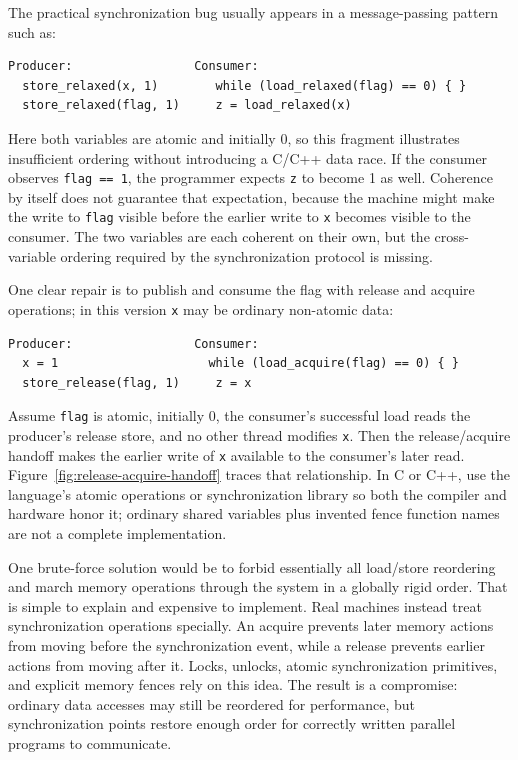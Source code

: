 The practical synchronization bug usually appears in a message-passing pattern such as:
\begin{verbatim}
Producer:                 Consumer:
  store_relaxed(x, 1)        while (load_relaxed(flag) == 0) { }
  store_relaxed(flag, 1)     z = load_relaxed(x)
\end{verbatim}
Here both variables are atomic and initially 0, so this fragment illustrates insufficient ordering without introducing a C/C++ data race.
If the consumer observes \texttt{flag == 1}, the programmer expects \texttt{z} to become 1 as well.
Coherence by itself does not guarantee that expectation, because the machine might make the write to \texttt{flag} visible before the earlier write to \texttt{x} becomes visible to the consumer.
The two variables are each coherent on their own, but the cross-variable ordering required by the synchronization protocol is missing.

One clear repair is to publish and consume the flag with release and acquire operations; in this version \texttt{x} may be ordinary non-atomic data:
\begin{verbatim}
Producer:                 Consumer:
  x = 1                     while (load_acquire(flag) == 0) { }
  store_release(flag, 1)     z = x
\end{verbatim}
Assume \texttt{flag} is atomic, initially 0, the consumer's successful load reads the producer's release store, and no other thread modifies \texttt{x}.
Then the release/acquire handoff makes the earlier write of \texttt{x} available to the consumer's later read.
Figure~\ref{fig:release-acquire-handoff} traces that relationship.
In C or C++, use the language's atomic operations or synchronization library so both the compiler and hardware honor it; ordinary shared variables plus invented fence function names are not a complete implementation.


One brute-force solution would be to forbid essentially all load/store reordering and march memory operations through the system in a globally rigid order.
That is simple to explain and expensive to implement.
Real machines instead treat synchronization operations specially.
An acquire prevents later memory actions from moving before the synchronization event, while a release prevents earlier actions from moving after it.
Locks, unlocks, atomic synchronization primitives, and explicit memory fences rely on this idea.
The result is a compromise: ordinary data accesses may still be reordered for performance, but synchronization points restore enough order for correctly written parallel programs to communicate.

